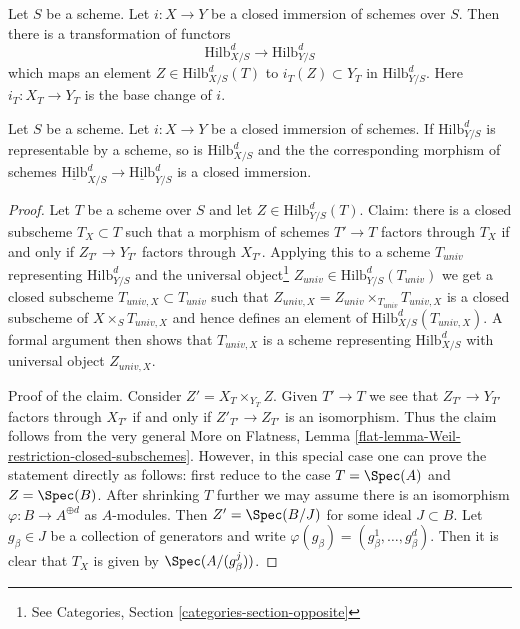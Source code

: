 \noindent
Let $S$ be a scheme. Let $i : X \to Y$ be a closed immersion of schemes
over $S$. Then there is a transformation of functors
$$
\text{Hilb}^d_{X/S} \longrightarrow \text{Hilb}^d_{Y/S}
$$
which maps an element $Z \in \text{Hilb}^d_{X/S}(T)$ to
$i_T(Z) \subset Y_T$ in $\text{Hilb}^d_{Y/S}$. Here $i_T : X_T \to Y_T$
is the base change of $i$.

\begin{lemma}
\label{lemma-hilb-d-of-closed}
Let $S$ be a scheme. Let $i : X \to Y$ be a closed immersion of schemes.
If $\text{Hilb}^d_{Y/S}$ is representable by a scheme, so is
$\text{Hilb}^d_{X/S}$ and the the corresponding morphism of schemes
$\underline{\text{Hilb}}^d_{X/S} \to \underline{\text{Hilb}}^d_{Y/S}$
is a closed immersion.
\end{lemma}

\begin{proof}
Let $T$ be a scheme over $S$ and let $Z \in \text{Hilb}^d_{Y/S}(T)$.
Claim: there is a closed subscheme $T_X \subset T$ such
that a morphism of schemes $T' \to T$ factors through $T_X$ if
and only if $Z_{T'} \to Y_{T'}$ factors through $X_{T'}$.
Applying this to a scheme $T_{univ}$ representing $\text{Hilb}^d_{Y/S}$ and the
universal object\footnote{See
Categories, Section \ref{categories-section-opposite}}
$Z_{univ} \in \text{Hilb}^d_{Y/S}(T_{univ})$
we get a closed subscheme $T_{univ, X} \subset T_{univ}$ such that
$Z_{univ, X} = Z_{univ} \times_{T_{univ}} T_{univ, X}$
is a closed subscheme of $X \times_S T_{univ, X}$ and hence
defines an element of $\text{Hilb}^d_{X/S}(T_{univ, X})$.
A formal argument then shows that $T_{univ, X}$ is a scheme
representing $\text{Hilb}^d_{X/S}$ with universal object $Z_{univ, X}$.

\medskip\noindent
Proof of the claim. Consider $Z' = X_T \times_{Y_T} Z$. Given $T' \to T$
we see that $Z_{T'} \to Y_{T'}$ factors through $X_{T'}$ if and
only if $Z'_{T'} \to Z_{T'}$ is an isomorphism. Thus the claim follows
from the very general
More on Flatness, Lemma \ref{flat-lemma-Weil-restriction-closed-subschemes}.
However, in this special case one can prove the statement directly as
follows: first reduce to the case $T = \Spec(A)$ and $Z = \Spec(B)$.
After shrinking $T$ further we may assume there is an isomorphism
$\varphi : B \to A^{\oplus d}$ as $A$-modules. Then $Z' = \Spec(B/J)$
for some ideal $J \subset B$. Let $g_\beta \in J$ be a collection of
generators and write $\varphi(g_\beta) = (g_\beta^1, \ldots, g_\beta^d)$.
Then it is clear that $T_X$ is given by $\Spec(A/(g_\beta^j))$.
\end{proof}

